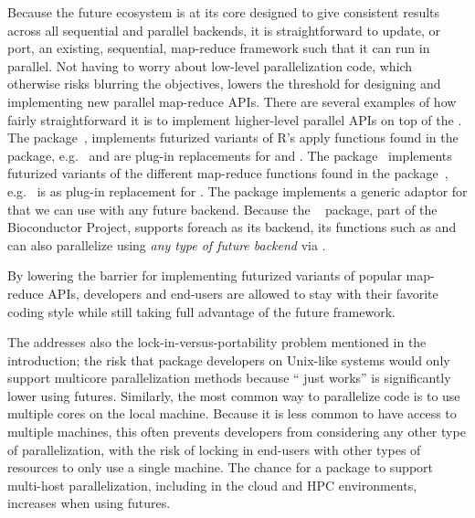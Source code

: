 Because the future ecosystem is at its core designed to give
consistent results across all sequential and parallel backends, it is
straightforward to update, or port, an existing, sequential,
map-reduce framework such that it can run in parallel. Not having to
worry about low-level parallelization code, which otherwise risks
blurring the objectives, lowers the threshold for designing and
implementing new parallel map-reduce APIs.  There are several examples
of how fairly straightforward it is to implement higher-level parallel
APIs on top of the .  The 
package~\citep{CRAN:future.apply}, implements futurized variants of
R's apply functions found in the  package,
e.g.\  and  are plug-in
replacements for  and .  The 
package~\citep{CRAN:furrr} implements futurized variants of the
different map-reduce functions found in the 
package~\citep{CRAN:purrr}, e.g.\  is as plug-in
replacement for .  The  package implements a
generic  adaptor
for  that we can use
with any future backend.  Because
the ~\citep{Bioc:BiocParallel} package, part of
the Bioconductor Project, supports foreach as its backend, its
functions such as  and  can also
parallelize using \emph{any type of future backend} via
.

By lowering the barrier for implementing futurized variants of popular
map-reduce APIs, developers and end-users are allowed to stay with
their favorite coding style while still taking full advantage of the
future framework.

The  addresses also the lock-in-versus-portability
problem mentioned in the introduction; the risk that package
developers on Unix-like systems would only support multicore
parallelization methods because `` just works'' is
significantly lower using futures.  Similarly, the most common way to
parallelize code is to use multiple cores on the local machine.
Because it is less common to have access to multiple machines, this
often prevents developers from considering any other type of
parallelization, with the risk of locking in end-users with other
types of resources to only use a single machine.  The chance for a
package to support multi-host parallelization, including in the cloud
and HPC environments, increases when using futures.

